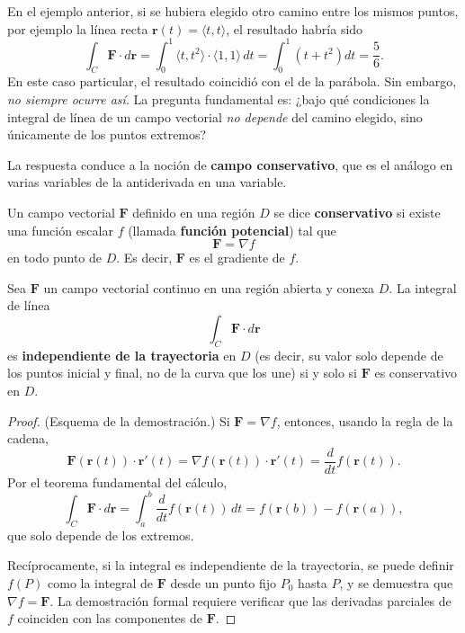 En el ejemplo anterior, si se hubiera elegido otro camino entre los
mismos puntos, por ejemplo la línea recta $\mathbf{r}(t)=\langle t,t
\rangle$, el resultado habría sido
\[
\int_C \mathbf{F}\cdot d\mathbf{r}
= \int_0^1 \langle t, t^2 \rangle \cdot \langle 1,1 \rangle \, dt
= \int_0^1 (t+t^2) dt = \frac{5}{6}.
\]
En este caso particular, el resultado coincidió con el de la parábola.
Sin embargo, \emph{no siempre ocurre así}. La pregunta fundamental es:
¿bajo qué condiciones la integral de línea de un campo vectorial
\emph{no depende} del camino elegido, sino únicamente de los puntos
extremos?

La respuesta conduce a la noción de \textbf{campo conservativo}, que
es el análogo en varias variables de la antiderivada en una variable.

\begin{definition}
Un campo vectorial $\mathbf{F}$ definido en una región $D$ se dice
\textbf{conservativo} si existe una función escalar $f$ (llamada
\textbf{función potencial}) tal que
\[
\mathbf{F} = \nabla f
\]
en todo punto de $D$. Es decir, $\mathbf{F}$ es el gradiente de $f$.
\end{definition}

\begin{theorem}
Sea $\mathbf{F}$ un campo vectorial continuo en una región abierta y
conexa $D$. La integral de línea
\[
\int_C \mathbf{F} \cdot d\mathbf{r}
\]
es \textbf{independiente de la trayectoria} en $D$ (es decir, su valor
solo depende de los puntos inicial y final, no de la curva que los une)
si y solo si $\mathbf{F}$ es conservativo en $D$.
\end{theorem}

\begin{proof}
(Esquema de la demostración.) Si $\mathbf{F}=\nabla f$, entonces,
usando la regla de la cadena,
\[
\mathbf{F}(\mathbf{r}(t)) \cdot \mathbf{r}'(t)
= \nabla f(\mathbf{r}(t)) \cdot \mathbf{r}'(t)
= \frac{d}{dt} f(\mathbf{r}(t)).
\]
Por el teorema fundamental del cálculo,
\[
\int_C \mathbf{F} \cdot d\mathbf{r}
= \int_a^b \frac{d}{dt} f(\mathbf{r}(t)) \, dt
= f(\mathbf{r}(b)) - f(\mathbf{r}(a)),
\]
que solo depende de los extremos.

Recíprocamente, si la integral es independiente de la trayectoria, se
puede definir $f(P)$ como la integral de $\mathbf{F}$ desde un punto
fijo $P_0$ hasta $P$, y se demuestra que $\nabla f = \mathbf{F}$.
La demostración formal requiere verificar que las derivadas parciales
de $f$ coinciden con las componentes de $\mathbf{F}$.
\end{proof}

